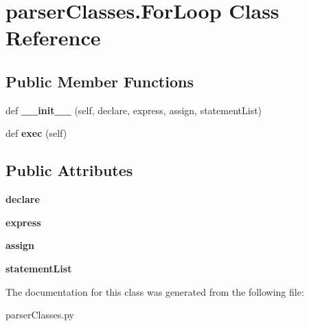 \hypertarget{classparser_classes_1_1_for_loop}{}\section{parser\+Classes.\+For\+Loop Class Reference}
\label{classparser_classes_1_1_for_loop}
\subsection*{Public Member Functions}
\begin{DoxyCompactItemize}
\item 
def {\bfseries \+\_\+\+\_\+init\+\_\+\+\_\+} (self, declare, express, assign, statement\+List)\hypertarget{classparser_classes_1_1_for_loop_a493415116c52fd7fa290ea6a690a14a9}{}\label{classparser_classes_1_1_for_loop_a493415116c52fd7fa290ea6a690a14a9}

\item 
def {\bfseries exec} (self)\hypertarget{classparser_classes_1_1_for_loop_ad3137f5077049d1ec6c6237ede82fb00}{}\label{classparser_classes_1_1_for_loop_ad3137f5077049d1ec6c6237ede82fb00}

\end{DoxyCompactItemize}
\subsection*{Public Attributes}
\begin{DoxyCompactItemize}
\item 
{\bfseries declare}\hypertarget{classparser_classes_1_1_for_loop_a65197911c246be2c9f668ae4d41fe4d8}{}\label{classparser_classes_1_1_for_loop_a65197911c246be2c9f668ae4d41fe4d8}

\item 
{\bfseries express}\hypertarget{classparser_classes_1_1_for_loop_a8ae2f63e3678abacad591c63921f3181}{}\label{classparser_classes_1_1_for_loop_a8ae2f63e3678abacad591c63921f3181}

\item 
{\bfseries assign}\hypertarget{classparser_classes_1_1_for_loop_a178c81dcf1d041491a8b54f901bf9059}{}\label{classparser_classes_1_1_for_loop_a178c81dcf1d041491a8b54f901bf9059}

\item 
{\bfseries statement\+List}\hypertarget{classparser_classes_1_1_for_loop_ac776ecf176b1bbead46bb6a2e9061668}{}\label{classparser_classes_1_1_for_loop_ac776ecf176b1bbead46bb6a2e9061668}

\end{DoxyCompactItemize}


The documentation for this class was generated from the following file\+:\begin{DoxyCompactItemize}
\item 
parser\+Classes.\+py\end{DoxyCompactItemize}
